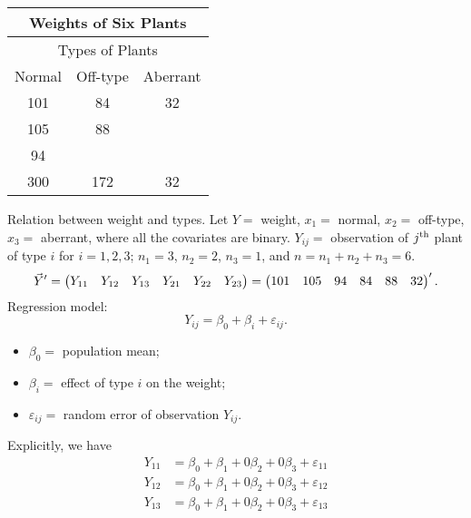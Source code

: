\begin{Example}{}{}
    \begin{center}
        \begin{tabular}{ccc}
            \toprule
            \multicolumn{3}{c}{Weights of Six Plants} \\
            \midrule
            \multicolumn{3}{c}{Types of Plants}       \\
            \midrule
            Normal & Off-type & Aberrant              \\
            101    & 84       & 32                    \\
            105    & 88                               \\
            94                                        \\
            \midrule\midrule
            300    & 172      & 32                    \\
            \bottomrule
        \end{tabular}
    \end{center}
    Relation between weight and types.
    Let $ Y= $ weight, $ x_1= $ normal, $ x_2= $ off-type, $ x_3= $ aberrant,
    where all the covariates are binary.
    $ Y_{ij}= $ observation of $ j\textsuperscript{th} $ plant of type $ i $ for $ i=1,2,3 $;
    $ n_1=3 $, $ n_2=2 $, $ n_3=1 $, and $ n=n_1+n_2+n_3=6 $.
    \[ \vec{Y}'=\begin{pmatrix}
            Y_{11} & Y_{12} & Y_{13} & Y_{21} & Y_{22} & Y_{23}
        \end{pmatrix}=\begin{pmatrix}
            101 & 105 & 94 & 84 & 88 & 32
        \end{pmatrix}'. \]
    Regression model:
    \[ Y_{ij}=\beta_0+\beta_i+\varepsilon_{ij}. \]
    \begin{itemize}
        \item $ \beta_0= $ population mean;
        \item $ \beta_i= $ effect of type $ i $ on the weight;
        \item $ \varepsilon_{ij}= $ random error of observation $ Y_{ij} $.
    \end{itemize}
    Explicitly, we have
    \begin{align*}
        Y_{11} & =\beta_0+\beta_1+0\beta_2+0\beta_3+\varepsilon_{11}  \\
        Y_{12} & =\beta_0+\beta_1+0\beta_2+0\beta_3+\varepsilon_{12}  \\
        Y_{13} & =\beta_0+\beta_1+0\beta_2+0\beta_3+\varepsilon_{13}  \\

\end{align*}
\end{Example}
